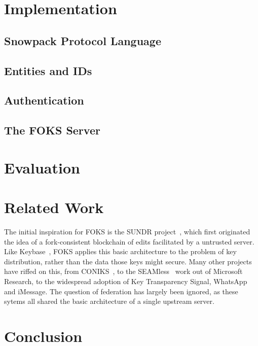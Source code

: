 \documentclass[11pt]{article}
\begin{document}
\section{Implementation}

\subsection{Snowpack Protocol Language}

\subsection{Entities and IDs}
\label{sec:ids}

\subsection{Authentication}
\label{sec:authentication}

\subsection{The FOKS Server}
\label{sec:foks-server}

\section{Evaluation}

\section{Related Work}

The initial inspiration for FOKS is the SUNDR project~\cite{sundr}, which first
originated the idea of a fork-consistent blockchain of edits facilitated by a
untrusted server.  Like Keybase~\cite{keybase}, FOKS applies this basic
architecture to the problem of key distribution, rather than the data those keys
might secure. Many other projects have riffed on this, from
CONIKS~\cite{melara2015coniks}, to the SEAMless~\cite{chase2019seemless} work
out of Microsoft Research, to the widespread adoption of Key Transparency
Signal, WhatsApp and iMessage.  The question of federation has largely been
ignored, as these sytems all shared the basic architecture of a single upstream
server.

\section{Conclusion}



\end{document}

